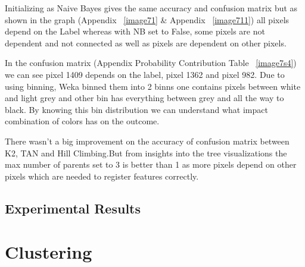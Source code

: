 \documentclass[11pt]{article}
\begin{document}
Initializing as Naive Bayes gives the same accuracy and confusion matrix but as shown in the graph (Appendix ~\ref{image71} \& Appendix ~\ref{image711}) all pixels depend on the Label whereas with NB set to False, some pixels are not dependent and not connected as well as pixels are dependent on other pixels.

In the confusion matrix (Appendix Probability Contribution Table ~\ref{image7s4}) we can see pixel 1409 depends on the label, pixel 1362 and pixel 982. Due to using binning, Weka binned them into 2 binns one contains pixels between white and light grey and other bin has everything between grey and all the way to black. By knowing this bin distribution we can understand what impact combination of colors has on the outcome.

There wasn't a big improvement on the accuracy of confusion matrix between K2, TAN and Hill Climbing.But from insights into the tree visualizations the max number of parents set to 3 is better than 1 as more pixels depend on other pixels which are needed to register features correctly.


\subsection{Experimental Results}

\pagebreak

\section{Clustering}
\end{document}
